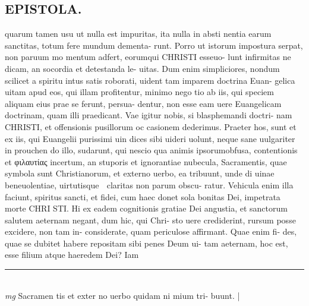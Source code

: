 \documentclass{article}
\begin{document}
\begin{pages}
\section*{EPISTOLA.  }\pstart quarum tamen usu ut nulla est impuritas, ita nulla in absti nentia earum sanctitas, totum fere mundum dementa- runt.  Porro ut istorum impostura serpat, non paruum mo mentum adfert, eorumqui CHRISTI esseuo- lunt infirmitas ne dicam, an socordia et detestanda le- uitas.  Dum enim simpliciores, nondum scilicet a spiritu intus satis roborati, uident tam imparem doctrina Euan- gelica uitam apud eos, qui illam profitentur, minimo nego tio ab iis, qui speciem aliquam eius prae se ferunt, persua- dentur, non esse eam uere Euangelicam doctrinam, quam illi praedicant.  Vae igitur nobis, si blasphemandi doctri- nam CHRISTI, et offensionis pusillorum oc casionem dederimus.   \pend\pstart Praeter hos, sunt et ex iis, qui Euangelii purissimi uin dices sibi uideri uolunt, neque sane uulgariter in prouchen do illo, sudarunt, qui nescio qua animis ipsorumobfusa, contentionis et φιλαυτίας incertum, an stuporis et ignorantiae nubecula, Sacramentis, quae symbola sunt Christianorum, et externo uerbo, ea tribuunt, unde di uinae beneuolentiae, uirtutisque  claritas non parum obscu- ratur.  Vehicula enim illa faciunt, spiritus sancti, et fidei, cum haec donet sola bonitas Dei, impetrata morte CHRI STI.  Hi ex eadem cognitionis gratiae Dei angustia, et sanctorum salutem aeternam negant, dum hic, qui Chri- sto uere crediderint, rursum posse excidere, non tam in- considerate, quam periculose affirmant.  Quae enim fi- des, quae se dubitet habere repositam sibi penes Deum ui- tam aeternam, hoc est, esse filium atque haeredem Dei? Iam  \pend
\vspace{0.5cm}\noindent
\vspace{0.2cm}\rule{1cm}{0.2pt}\\ 
\hspace{0.2cm}\textit{mg}
\footnotesize Sacramen tis et exter no uerbo quidam ni mium tri- buunt.  
\normalsize| 

\end{pages}
\end{document}
